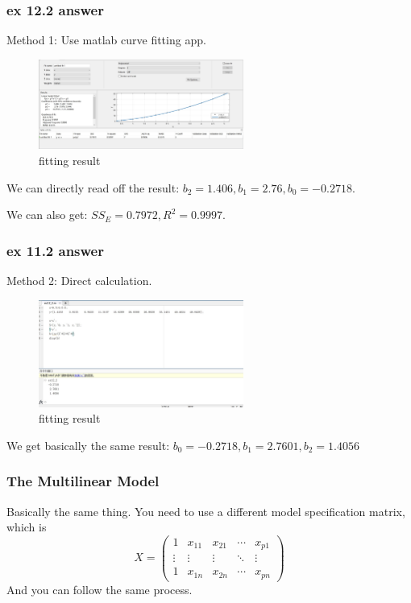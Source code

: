 \documentclass{beamer}
\begin{document}
\begin{frame}
    \frametitle{ex 12.2 answer}

    Method 1: Use matlab curve fitting app.\par
    \begin{figure}[H]
        \centering
        \includegraphics[width=0.6\textwidth,height=0.3\textwidth]{ex12_2_1.jpg}
        \caption{fitting result}
    \end{figure}\par
    We can directly read off the result: $b_2=1.406, b_1=2.76, b_0=-0.2718$. \par
    We can also get: $SS_{E}=0.7972, R^2=0.9997$.
\end{frame}

\begin{frame}
    \frametitle{ex 11.2 answer}
    Method 2: Direct calculation.
    \par
    \begin{figure}[H]
        \centering
        \includegraphics[width=0.6\textwidth,height=0.3\textwidth]{ex12_2_2.jpg}
        \caption{fitting result}
    \end{figure}\par
    We get basically the same result: $b_0=-0.2718, b_1=2.7601, b_2=1.4056$

\end{frame}

\begin{frame}
    \frametitle{The Multilinear Model}

    Basically the same thing. You need to use a different model specification matrix, which is
    \begin{equation*}
        X=
        \left(
        \begin{array}{ccccc}
            1 & x_{11} & x_{21} & \cdots & x_{p1}\\
            \vdots & \vdots & \vdots & \ddots & \vdots\\
            1 & x_{1n} & x_{2n} & \cdots & x_{pn}
        \end{array}
        \right)
    \end{equation*}
    And you can follow the same process.

\end{frame}
\end{document}
